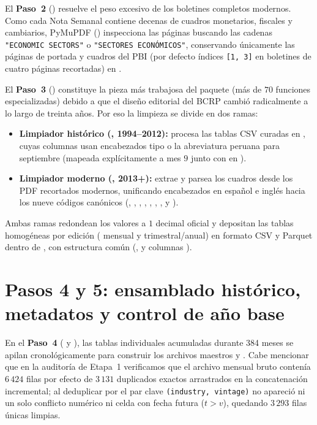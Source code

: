\documentclass[12pt,letterpaper]{article}
\begin{document}
El \textbf{Paso~2} () resuelve el peso excesivo de los boletines completos modernos. Como cada Nota Semanal contiene decenas de cuadros monetarios, fiscales y cambiarios, PyMuPDF () inspecciona las páginas buscando las cadenas \texttt{"ECONOMIC SECTORS"} o \texttt{"SECTORES ECONÓMICOS"}, conservando únicamente las páginas de portada y cuadros del PBI (por defecto índices \texttt{[1, 3]} en boletines de cuatro páginas recortadas) en .

El \textbf{Paso~3} () constituye la pieza más trabajosa del paquete (más de \(70\) funciones especializadas) debido a que el diseño editorial del BCRP cambió radicalmente a lo largo de treinta años. Por eso la limpieza se divide en dos ramas:
\begin{itemize}
  \item \textbf{Limpiador histórico (, 1994--2012):} procesa las tablas CSV curadas en , cuyas columnas usan encabezados tipo  o la abreviatura peruana  para septiembre (mapeada explícitamente a mes \(9\) junto con  en ).
  \item \textbf{Limpiador moderno (, 2013+):} extrae y parsea los cuadros desde los PDF recortados modernos, unificando encabezados en español e inglés hacia los nueve códigos canónicos (, , , , , , ,  y ).
\end{itemize}
Ambas ramas redondean los valores a \(1\) decimal oficial y depositan las tablas homogéneas por edición ( mensual y  trimestral/anual) en formato CSV y Parquet dentro de , con estructura común (,  y columnas ).

\section{Pasos 4 y 5: ensamblado histórico, metadatos y control de año base}

En el \textbf{Paso~4} ( y ), las tablas individuales acumuladas durante 384 meses se apilan cronológicamente para construir los archivos maestros  y . Cabe mencionar que en la auditoría de Etapa~1 verificamos que el archivo mensual bruto contenía \(6\,424\) filas por efecto de \(3\,131\) duplicados exactos arrastrados en la concatenación incremental; al deduplicar por el par clave \texttt{(industry, vintage)} no apareció ni un solo conflicto numérico ni celda con fecha futura (\(t > v\)), quedando \(3\,293\) filas únicas limpias.
\end{document}

